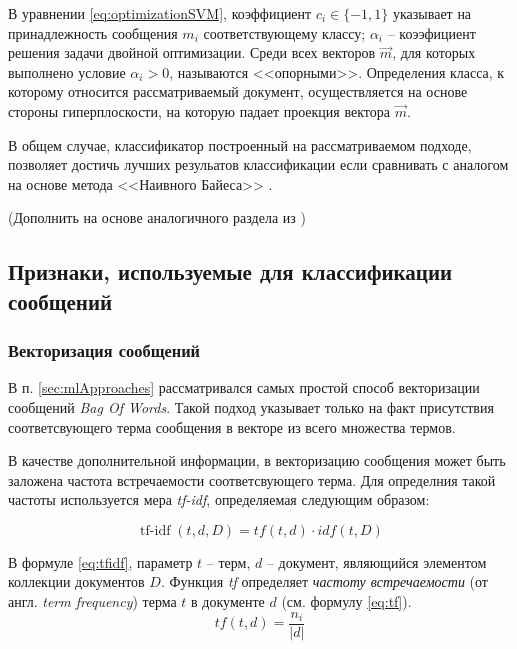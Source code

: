         В уравнении \ref{eq:optimizationSVM}, коэффициент $c_i \in \{-1, 1\}$
        указывает на принадлежность сообщения $m_i$ соответствующему классу;
        $\alpha_i$ -- коээфициент решения задачи двойной оптимизации. Среди всех
        векторов $\vec{m}$, для которых выполнено условие $\alpha_i > 0$, называются <<опорными>>.
        Определения класса, к которому относится рассматриваемый документ, осуществляется
        на основе стороны гиперплоскости, на которую падает проекция вектора $\vec{m}$.

        В общем случае, классификатор построенный на рассматриваемом подходе,
        позволяет достичь лучших резульатов классификации если сравнивать с
        аналогом на основе метода <<Наивного Байеса>> \cite{svmCompareVsNB}.

        (Дополнить на основе аналогичного раздела из \cite{islr})

    \subsection{Признаки, используемые для классификации сообщений}
        \subsubsection{Векторизация сообщений}
        В п. \ref{sec:mlApproaches} рассматривался самых простой способ
        векторизации сообщений {\it Bag Of Words}. Такой подход указывает
        только на факт присутствия соответсвующего терма сообщения в векторе
        из всего множества термов.

        В качестве дополнительной информации, в векторизацию сообщения может
        быть заложена частота встречаемости соответсвующего терма. Для определния
        такой частоты используется мера {\it tf-idf}, определяемая следующим образом:

        \newcommand\tfidf{\mathop{\mbox{$tf$-$idf$}}}
        \begin{equation}
            \label{eq:tfidf}
            \tfidf(t,d,D) = tf(t,d) \cdot idf(t, D)
        \end{equation}

        В формуле \ref{eq:tfidf}, параметр $t$ -- терм, $d$ -- документ, являющийся
        элементом коллекции документов $D$. Функция {\it tf} определяет {\it частоту встречаемости}
        (от англ. {\it term frequency}) терма $t$ в документе $d$ (см. формулу \ref{eq:tf}).
        \begin{equation}
            \label{eq:tf}
            tf(t, d) = \dfrac{n_i}{|d|}
        \end{equation}


